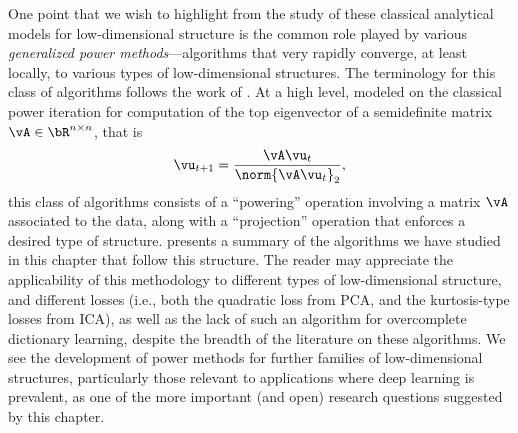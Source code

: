 \documentclass[../../book-main.tex]{subfiles}
\begin{document}
\begin{table}[tb]
    \centering
    \caption{Summary of (generalized) power methods presented in this chapter.}
    \label{tab:power-method-summary}
\end{table}

One point that we wish to highlight from the study of these classical
analytical models for low-dimensional structure is the common role played by
various \textit{generalized power methods}---algorithms that very rapidly
converge, at
least locally, to various types of low-dimensional structures. The terminology
for this class of algorithms follows the work of \textcite{JourneeM2010}.
At a high level, modeled on the classical power iteration for
computation of the top
eigenvector of a semidefinite matrix $\vA \in \bR^{n \times n}$, that is
\begin{equation}
    \vu_{t+1} = \frac{\vA \vu_{t}}{\norm{\vA \vu_{t}}_2},
\end{equation}
this class of algorithms consists of a ``powering'' operation involving a matrix
$\vA$ associated to the data, along with a ``projection'' operation that
enforces a desired type of structure.  presents
a summary of the algorithms we have studied in this chapter that follow this
structure. The reader may appreciate the applicability of this methodology to
different types of low-dimensional structure, and different losses (i.e., both
the quadratic loss from PCA, and the kurtosis-type losses from ICA), as well as
the lack of such an algorithm for overcomplete dictionary learning, despite the
breadth of the literature on these algorithms. We see the development of power
methods for further families of low-dimensional structures, particularly those
relevant to applications where deep learning is prevalent, as one of the more
important (and open) research questions suggested by this chapter.
\end{document}
